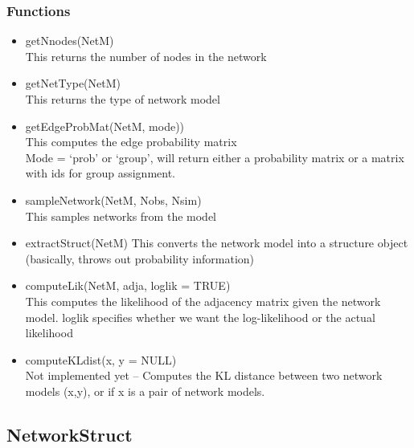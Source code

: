 \documentclass[11pt]{article}
\begin{document}
\subsubsection{Functions}
\begin{itemize} 
\item getNnodes(NetM)\\
This returns the number of nodes in the network
\item getNetType(NetM)\\
This returns the type of network model
\item getEdgeProbMat(NetM, mode))\\
This computes the edge probability matrix\\
Mode = `prob' or `group', will return either a probability matrix or a matrix with ids for group assignment. 
\item sampleNetwork(NetM, Nobs, Nsim)\\
This samples networks from the model
\item extractStruct(NetM)
This converts the network model into a structure object (basically, throws out probability information)
\item computeLik(NetM, adja, loglik = TRUE)\\
This computes the likelihood of the adjacency matrix given the network model. loglik specifies whether we want the log-likelihood or the actual likelihood
\item computeKLdist(x, y = NULL) \\
Not implemented yet -- Computes the KL distance between two network models (x,y), or if x is a pair of network models. 
\end{itemize}

\subsection{NetworkStruct}
\end{document}
